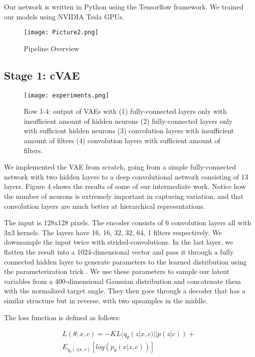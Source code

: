 \documentclass[10pt,conference]{IEEEtran}
\begin{document}
Our network is written in Python using the Tensorflow framework. We trained our models using NVIDIA Tesla GPUs.

\begin{figure*}[htbp]
\centering
\texttt{[image: Picture2.png]}
\caption{Pipeline Overview}
\end{figure*}

\subsection{Stage 1: cVAE}

\begin{figure}[htbp]
\centering
\texttt{[image: experiments.png]}
\caption{Row 1-4: output of VAEs with (1) fully-connected layers only with insufficient amount of  hidden neurons (2) fully-connected layers only with sufficient hidden neurons (3) convolution layers with insufficient amount of filters (4) convolution layers with sufficient amount of filters. }
\end{figure}

We implemented the VAE from scratch, going from a simple fully-connected network with two hidden layers to a deep convolutional network consisting of 13 layers. Figure 4 shows the results of some of our intermediate work. Notice how the number of neurons is extremely important in capturing variation, and that convolution layers are much better at hierarchical representations.

The input is 128x128 pixels. The encoder consists of 6 convolution layers all with 3x3 kernels. The layers have 16, 16, 32, 32, 64, 1 filters respectively. We downsample the input twice with strided-convolutions. In the last layer, we flatten the result into a 1024-dimensional vector and pass it through a fully connected hidden layer to generate parameters to the learned distribution using the parameterization trick \autocite{kingma2013auto}. We use these parameters to sample our latent variables from a 400-dimensional Gaussian distribution and concatenate them with the normalized target angle. They then goes through a decoder that has a similar structure but in reverse, with two upsamples in the middle.

The loss function is defined as follows:

\begin{multline}
L(\theta;x, c)= -KL(q_\theta(z|x, c)||p(z|c))+ \\
E_{q_\theta(z|x, c)}[log(p_\theta(x|z, c))]
\end{multline}
\end{document}
